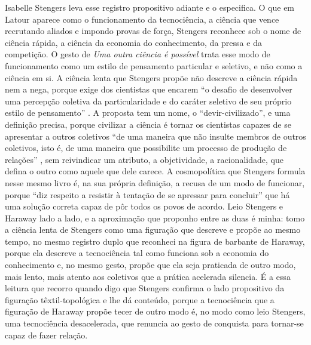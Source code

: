 Isabelle Stengers leva esse registro propositivo adiante e o especifica. O que em Latour aparece como o funcionamento da tecnociência, a ciência que vence recrutando aliados e impondo provas de força, Stengers reconhece sob o nome de ciência rápida, a ciência da economia do conhecimento, da pressa e da competição. O gesto de \emph{Uma outra ciência é possível} trata esse modo de funcionamento como um estilo de pensamento particular e seletivo, e não como a ciência em si. A ciência lenta que Stengers propõe não descreve a ciência rápida nem a nega, porque exige dos cientistas que encarem \enquote{o desafio de desenvolver uma percepção coletiva da particularidade e do caráter seletivo de seu próprio estilo de pensamento} \parencite[p.~117]{stengers2018another}. A proposta tem um nome, o \enquote{devir-civilizado}, e uma definição precisa, porque civilizar a ciência é tornar os cientistas capazes de se apresentar a outros coletivos \enquote{de uma maneira que não insulte membros de outros coletivos, isto é, de uma maneira que possibilite um processo de produção de relações} \parencite[p.~117]{stengers2018another}, sem reivindicar um atributo, a objetividade, a racionalidade, que defina o outro como aquele que dele carece. A cosmopolítica que Stengers formula nesse mesmo livro é, na sua própria definição, a recusa de um modo de funcionar, porque \enquote{diz respeito a resistir à tentação de se apressar para concluir} \parencite[p.~167]{stengers2018another} que há uma solução correta capaz de pôr todos os povos de acordo. Leio Stengers e Haraway lado a lado, e a aproximação que proponho entre as duas é minha: tomo a ciência lenta de Stengers como uma figuração que descreve e propõe ao mesmo tempo, no mesmo registro duplo que reconheci na figura de barbante de Haraway, porque ela descreve a tecnociência tal como funciona sob a economia do conhecimento e, no mesmo gesto, propõe que ela seja praticada de outro modo, mais lento, mais atento aos coletivos que a prática acelerada silencia. É a essa leitura que recorro quando digo que Stengers confirma o lado propositivo da figuração têxtil-topológica e lhe dá conteúdo, porque a tecnociência que a figuração de Haraway propõe tecer de outro modo é, no modo como leio Stengers, uma tecnociência desacelerada, que renuncia ao gesto de conquista para tornar-se capaz de fazer relação. %

